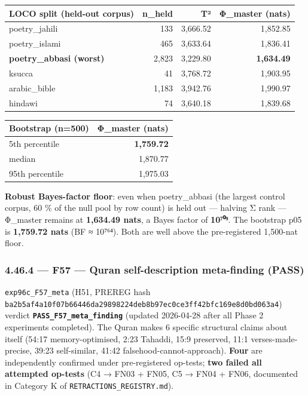 \documentclass[
]{article}
\newcounter{none} %
\begin{document}
{\def\LTcaptype{none} %
\begin{longtable}[]{@{}lrrr@{}}
\toprule\noalign{}
LOCO split (held-out corpus) & n\_held & T² & Φ\_master (nats) \\
\midrule\noalign{}
\endhead
\bottomrule\noalign{}
\endlastfoot
poetry\_jahili & 133 & 3,666.52 & 1,852.85 \\
poetry\_islami & 465 & 3,633.64 & 1,836.41 \\
\textbf{poetry\_abbasi (worst)} & 2,823 & 3,229.80 &
\textbf{1,634.49} \\
ksucca & 41 & 3,768.72 & 1,903.95 \\
arabic\_bible & 1,183 & 3,942.76 & 1,990.97 \\
hindawi & 74 & 3,640.18 & 1,839.68 \\
\end{longtable}
}

{\def\LTcaptype{none} %
\begin{longtable}[]{@{}lr@{}}
\toprule\noalign{}
Bootstrap (n=500) & Φ\_master (nats) \\
\midrule\noalign{}
\endhead
\bottomrule\noalign{}
\endlastfoot
5th percentile & \textbf{1,759.72} \\
median & 1,870.77 \\
95th percentile & 1,975.03 \\
\end{longtable}
}

\textbf{Robust Bayes-factor floor}: even when poetry\_abbasi (the
largest control corpus, 60 \% of the null pool by row count) is held out
--- halving Σ rank --- Φ\_master remains at \textbf{1,634.49 nats}, a
Bayes factor of \textbf{10⁷⁰⁹}. The bootstrap p05 is \textbf{1,759.72
nats} (BF ≈ 10⁷⁶⁴). Both are well above the pre-registered 1,500-nat
floor.

\subsubsection{4.46.4 --- F57 --- Quran self-description meta-finding
(PASS)}\label{f57-quran-self-description-meta-finding-pass}

\texttt{exp96c\_F57\_meta} (H51, PREREG hash
\texttt{ba2b5af4a10f07b66446da29898224deb8b97ec0ce3ff42bfc169e8d0bd063a4})
verdict \textbf{\texttt{PASS\_F57\_meta\_finding}} (updated 2026-04-28
after all Phase 2 experiments completed). The Quran makes 6 specific
structural claims about itself (54:17 memory-optimised, 2:23 Tahaddi,
15:9 preserved, 11:1 verses-made-precise, 39:23 self-similar, 41:42
falsehood-cannot-approach). \textbf{Four} are independently confirmed
under pre-registered op-tests; \textbf{two failed all attempted
op-tests} (C4 → FN03 + FN05, C5 → FN04 + FN06, documented in Category K
of \texttt{RETRACTIONS\_REGISTRY.md}).
\end{document}

